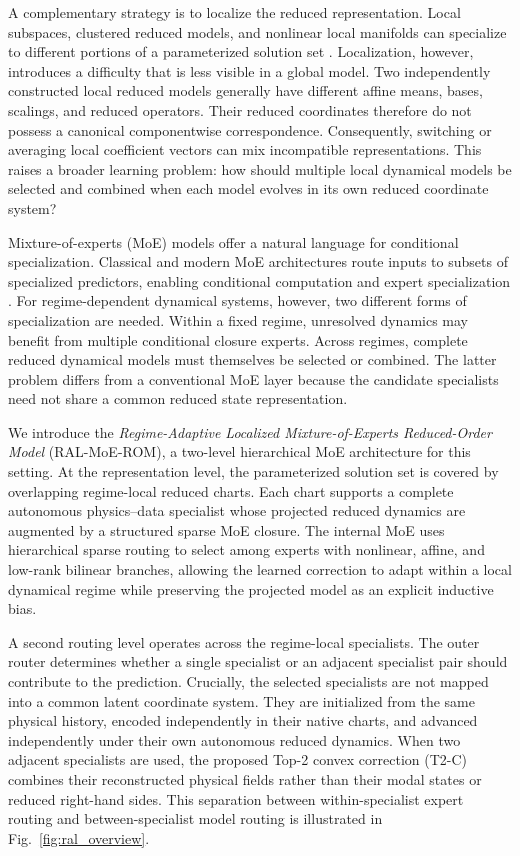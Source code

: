 A complementary strategy is to localize the reduced representation.
Local subspaces, clustered reduced models, and nonlinear local manifolds can specialize to
different portions of a parameterized solution set \citep{kaiser2014,li2021cluster,diaz2024}.
Localization, however, introduces a difficulty that is less visible in a global model.
Two independently constructed local reduced models generally have different affine means,
bases, scalings, and reduced operators.
Their reduced coordinates therefore do not possess a canonical componentwise
correspondence.
Consequently, switching or averaging local coefficient vectors can mix incompatible
representations.
This raises a broader learning problem: how should multiple local dynamical models be
selected and combined when each model evolves in its own reduced coordinate system?

Mixture-of-experts (MoE) models offer a natural language for conditional specialization.
Classical and modern MoE architectures route inputs to subsets of specialized predictors,
enabling conditional computation and expert specialization
\citep{jacobs1991,jordan1994,shazeer2017,fedus2022}.
For regime-dependent dynamical systems, however, two different forms of specialization are
needed.
Within a fixed regime, unresolved dynamics may benefit from multiple conditional closure
experts.
Across regimes, complete reduced dynamical models must themselves be selected or combined.
The latter problem differs from a conventional MoE layer because the candidate specialists
need not share a common reduced state representation.

We introduce the \emph{Regime-Adaptive Localized Mixture-of-Experts Reduced-Order Model}
(RAL-MoE-ROM), a two-level hierarchical MoE architecture for this setting.
At the representation level, the parameterized solution set is covered by overlapping
regime-local reduced charts.
Each chart supports a complete autonomous physics--data specialist whose projected reduced
dynamics are augmented by a structured sparse MoE closure.
The internal MoE uses hierarchical sparse routing to select among experts with nonlinear,
affine, and low-rank bilinear branches, allowing the learned correction to adapt within a
local dynamical regime while preserving the projected model as an explicit inductive bias.

A second routing level operates across the regime-local specialists.
The outer router determines whether a single specialist or an adjacent specialist pair
should contribute to the prediction.
Crucially, the selected specialists are not mapped into a common latent coordinate system.
They are initialized from the same physical history, encoded independently in their native
charts, and advanced independently under their own autonomous reduced dynamics.
When two adjacent specialists are used, the proposed Top-2 convex correction (T2-C)
combines their reconstructed physical fields rather than their modal states or reduced
right-hand sides.
This separation between within-specialist expert routing and between-specialist model
routing is illustrated in Fig.~\ref{fig:ral_overview}.

